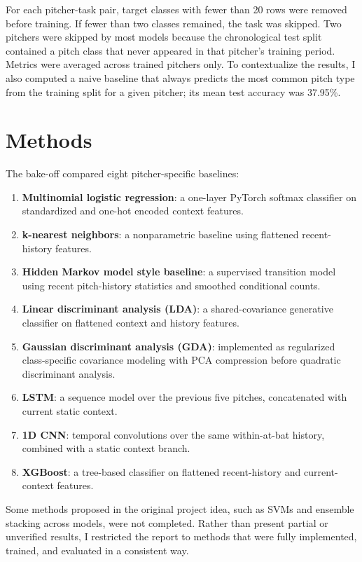 \documentclass{article}
\begin{document}
For each pitcher-task pair, target classes with fewer than 20 rows were removed before training. If fewer than two classes remained, the task was skipped. Two pitchers were skipped by most models because the chronological test split contained a pitch class that never appeared in that pitcher's training period. Metrics were averaged across trained pitchers only. To contextualize the results, I also computed a naive baseline that always predicts the most common pitch type from the training split for a given pitcher; its mean test accuracy was 37.95\%.

\section{Methods}
The bake-off compared eight pitcher-specific baselines:
\begin{enumerate}
\item \textbf{Multinomial logistic regression}: a one-layer PyTorch softmax classifier on standardized and one-hot encoded context features.
\item \textbf{k-nearest neighbors}: a nonparametric baseline using flattened recent-history features.
\item \textbf{Hidden Markov model style baseline}: a supervised transition model using recent pitch-history statistics and smoothed conditional counts.
\item \textbf{Linear discriminant analysis (LDA)}: a shared-covariance generative classifier on flattened context and history features.
\item \textbf{Gaussian discriminant analysis (GDA)}: implemented as regularized class-specific covariance modeling with PCA compression before quadratic discriminant analysis.
\item \textbf{LSTM}: a sequence model over the previous five pitches, concatenated with current static context.
\item \textbf{1D CNN}: temporal convolutions over the same within-at-bat history, combined with a static context branch.
\item \textbf{XGBoost}: a tree-based classifier on flattened recent-history and current-context features.
\end{enumerate}

Some methods proposed in the original project idea, such as SVMs and ensemble stacking across models, were not completed. Rather than present partial or unverified results, I restricted the report to methods that were fully implemented, trained, and evaluated in a consistent way.
\end{document}
